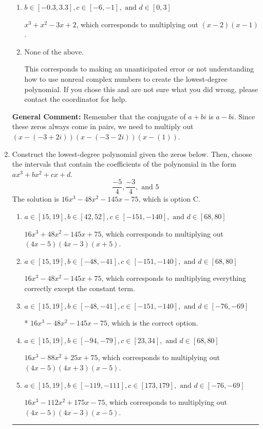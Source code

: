 \documentclass{extbook}[14pt]
\newcommand{\litem}[1]{\item #1

\rule{\textwidth}{0.4pt}}
\begin{document}
\begin{enumerate}
{\begin{enumerate}[label=\Alph*.]
$x^{3} + x^{2} +2 x -3$, which corresponds to multiplying out $(x + 3)(x -1)$.
\item \( b \in [-0.3, 3.3], c \in [-6, -1], \text{ and } d \in [0, 3] \)

$x^{3} + x^{2} -3 x + 2$, which corresponds to multiplying out $(x -2)(x -1)$.
\item \( \text{None of the above.} \)

This corresponds to making an unanticipated error or not understanding how to use nonreal complex numbers to create the lowest-degree polynomial. If you chose this and are not sure what you did wrong, please contact the coordinator for help.
\end{enumerate}

\textbf{General Comment:} Remember that the conjugate of $a+bi$ is $a-bi$. Since these zeros always come in pairs, we need to multiply out $(x-(-3 + 2 i))(x-(-3 - 2 i))(x-(1))$.
}
\litem{
Construct the lowest-degree polynomial given the zeros below. Then, choose the intervals that contain the coefficients of the polynomial in the form $ax^3+bx^2+cx+d$.
\[ \frac{-5}{4}, \frac{-3}{4}, \text{ and } 5 \]The solution is \( 16x^{3} -48 x^{2} -145 x -75 \), which is option C.\begin{enumerate}[label=\Alph*.]
\item \( a \in [15, 19], b \in [42, 52], c \in [-151, -140], \text{ and } d \in [68, 80] \)

$16x^{3} +48 x^{2} -145 x + 75$, which corresponds to multiplying out $(4x -5)(4x -3)(x + 5)$.
\item \( a \in [15, 19], b \in [-48, -41], c \in [-151, -140], \text{ and } d \in [68, 80] \)

$16x^{3} -48 x^{2} -145 x + 75$, which corresponds to multiplying everything correctly except the constant term.
\item \( a \in [15, 19], b \in [-48, -41], c \in [-151, -140], \text{ and } d \in [-76, -69] \)

* $16x^{3} -48 x^{2} -145 x -75$, which is the correct option.
\item \( a \in [15, 19], b \in [-94, -79], c \in [23, 34], \text{ and } d \in [68, 80] \)

$16x^{3} -88 x^{2} +25 x + 75$, which corresponds to multiplying out $(4x -5)(4x + 3)(x -5)$.
\item \( a \in [15, 19], b \in [-119, -111], c \in [173, 179], \text{ and } d \in [-76, -69] \)

$16x^{3} -112 x^{2} +175 x -75$, which corresponds to multiplying out $(4x -5)(4x -3)(x -5)$.
\end{enumerate}

}
\end{enumerate}
\end{document}
